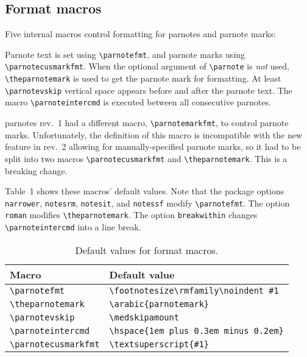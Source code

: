 \documentclass[10pt]{article}
\renewcommand{\parnotefmt}[1]{\centerline{\colorbox{black!10}{\parbox{0.82\textwidth}{\footnotesize\sffamily\noindent #1}}}}
\begin{document}
\subsection{Format macros}
Five internal macros control formatting for parnotes and parnote marks:

\medskip{}

\medskip\noindent Parnote text is set using \verb+\parnotefmt+, and parnote marks using \verb+\parnotecusmarkfmt+.
When the optional argument of \verb+\parnote+ is \emph{not} used, \verb+\theparnotemark+ is used to get
the parnote mark for formatting.
At least \verb+\parnotevskip+ vertical space appears before and after the parnote text. The macro
\verb+\parnoteintercmd+ is executed between all consecutive parnotes.

\textsf{parnotes} rev.~1 had a different macro, \verb+\parnotemarkfmt+, to control parnote marks.
Unfortunately, the definition of this macro is incompatible with the new feature in rev.~2 allowing for manually-specified parnote marks,
so it had to be split into two macros \verb+\parnotecusmarkfmt+ and \verb+\theparnotemark+. This is a breaking change.

Table~1 shows these macros' default values. Note that the package options \texttt{narrower},
\texttt{notesrm}, \texttt{notesit}, and \texttt{notessf} modify \verb+\parnotefmt+.
The option \texttt{roman} modifies \verb+\theparnotemark+.
The option \texttt{breakwithin} changes \verb+\parnoteintercmd+ into a line break.

\begin{table}[t]
\centering
\caption{Default values for format macros.}
\smallskip
\begin{tabular}{ll}
\toprule
Macro & Default value \\
\midrule
\verb+\parnotefmt+ & \verb+\footnotesize\rmfamily\noindent #1+ \\
\verb+\theparnotemark+ & \verb+\arabic{parnotemark}+ \\
\verb+\parnotevskip+ & \verb+\medskipamount+ \\
\verb+\parnoteintercmd+ & \verb+\hspace{1em plus 0.3em minus 0.2em}+ \\
\verb+\parnotecusmarkfmt+ & \verb+\textsuperscript{#1}+ \\
\bottomrule
\end{tabular}
\end{table}
\end{document}
